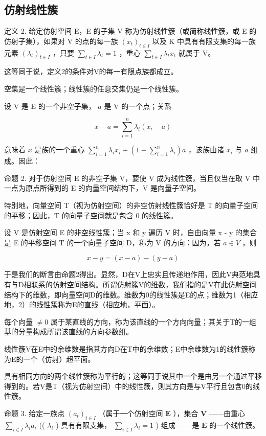 \subsection{仿射线性簇}

定义 2. 给定仿射空间 E，E 的子集 V 称为仿射线性簇（或简称线性簇，或 E 的仿射子集），如果对 V 的点的每一族 \((x_{t})_{t\in I}\) 以及 K 中具有有限支集的每一族元素 \((\lambda_t)_{t\in I}\) ，只要 \(\sum_{t\in I}\lambda_t = 1\) ，重心 \(\sum_{t\in I}\lambda_t x_t\) 就属于 V。

这等同于说，定义2的条件对V的每一有限点族都成立。

空集是一个线性簇；线性簇的任意交集仍是一个线性簇。

设 V 是 E 的一个非空子集， \(a\) 是 V 的一个点；关系

\[
x - a = \sum_ {i = 1} ^ {n} \lambda_ {i} (x _ {i} - a)
\]

意味着 \(x\) 是族的一个重心 \(\sum_{i=1}^{n} \lambda_i x_i + \left(1 - \sum_{i=1}^{n} \lambda_i\right)a\) ，该族由诸 \(x_i\) 与 \(a\) 组成。因此：

命题 2. 对于仿射空间 E 的非空子集 V，要使 V 成为线性簇，当且仅当在取 V 中一点为原点所得到的 E 的向量空间结构下，V 是向量子空间。

特别地，向量空间 T（视为仿射空间）的非空仿射线性簇恰好是 T 的向量子空间的平移；因此，T 的向量子空间就是包含 0 的线性簇。

设 V 是仿射空间 E 的非空线性簇；当 x 和 y 遍历 V 时，自由向量 x - y 的集合是 E 的平移空间 T 的一个向量子空间 D，称为 V 的方向：因为，若 \(a \in V\) ，则

\[
x - y = (x - a) - (y - a)
\]

于是我们的断言由命题2得出。显然，D在V上忠实且传递地作用，因此V典范地具有与D相联系的仿射空间结构。所谓仿射簇V的维数，我们指的是V在此仿射空间结构下的维数，即向量空间D的维数。维数为0的线性簇是E的点；维数为1（相应地，2）的线性簇称为E的直线（相应地，平面）。

每个向量 \(\neq0\) 属于某直线的方向，称为该直线的一个方向向量；其关于T的一组基的分量构成所谓该直线的方向参数组。

线性簇V在E中的余维数是指其方向D在T中的余维数；E中余维数为1的线性簇称为E的一个（仿射）超平面。

具有相同方向的两个线性簇称为平行的；这等同于说其中一个是由另一个通过平移得到的。若V是T（视为仿射空间）中的线性簇，则其方向是与V平行且包含0的线性簇。

命题 3. 给定一族点 \((a_{t})_{t\in I}\) （属于一个仿射空间 \(\mathbf{E}\) ），集合 \(\mathbf{V}\) ——由重心 \(\sum_{i\in I}\lambda_i a_i\) (( \(\lambda_i\) ) 具有有限支集， \(\sum_{i\in I}\lambda_i = 1\) ) 组成—— 是 \(\mathbf{E}\) 的一个线性簇。

